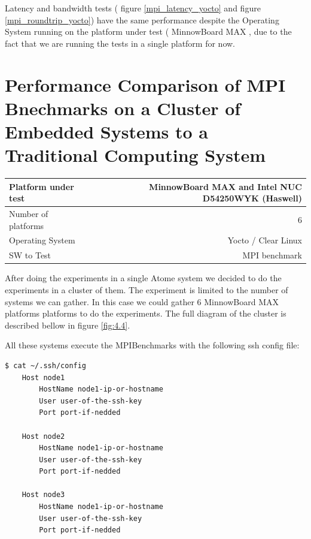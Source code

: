 Latency and bandwidth tests ( figure \ref{mpi_latency_yocto} and figure
\ref{mpi_roundtrip_yocto}) have the same performance despite the Operating
System running on the platform under test (  MinnowBoard MAX  , due to the fact
that we are running the tests in a single platform for now.


\section{Performance Comparison of MPI Bnechmarks on a Cluster of Embedded
Systems to a Traditional Computing System}

    \begin{center}
    \begin{tabular}{ | l | r |}
        \hline
        Platform under test &  MinnowBoard MAX  and Intel NUC D54250WYK
        (Haswell)\\ \hline
        Number of platforms  & 6  \\ \hline
        Operating System & Yocto / Clear Linux  \\ \hline
        SW to Test & MPI benchmark \\ \hline
    \end{tabular}
    \end{center}

After doing the experiments in a single Atome system we decided to do the
experiments in a cluster of them. The experiment is limited to the number of
systems we can gather. In this case we could gather 6  MinnowBoard MAX
platforms \cite{minnowboard} platforms to do the experiments. The full diagram
of the cluster is described bellow in figure \ref{fig:4.4}.


All these systems execute the MPIBenchmarks with the following ssh config file:

\begin{minipage}{\textwidth}
\end{minipage}

\begin{minipage}{\textwidth}

\begin{lstlisting}[frame=single]
  $ cat ~/.ssh/config
    Host node1
        HostName node1-ip-or-hostname
        User user-of-the-ssh-key
        Port port-if-nedded

    Host node2
        HostName node1-ip-or-hostname
        User user-of-the-ssh-key
        Port port-if-nedded

    Host node3
        HostName node1-ip-or-hostname
        User user-of-the-ssh-key
        Port port-if-nedded

\end{lstlisting}

\end{minipage}

